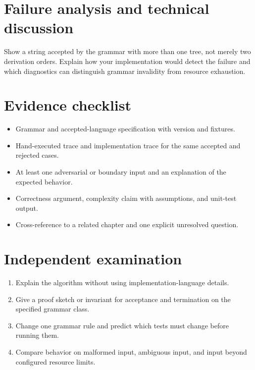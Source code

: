 \documentclass[11pt,letterpaper]{article}
\begin{document}
\section{Failure analysis and technical discussion}
Show a string accepted by the grammar with more than one tree, not merely two derivation orders. Explain how your implementation would detect the failure and which diagnostics can distinguish grammar invalidity from resource exhaustion.
\section{Evidence checklist}
\begin{itemize}
\item Grammar and accepted-language specification with version and fixtures.
\item Hand-executed trace and implementation trace for the same accepted and rejected cases.
\item At least one adversarial or boundary input and an explanation of the expected behavior.
\item Correctness argument, complexity claim with assumptions, and unit-test output.
\item Cross-reference to a related chapter and one explicit unresolved question.
\end{itemize}
\section{Independent examination}
\begin{enumerate}
\item Explain the algorithm without using implementation-language details.
\item Give a proof sketch or invariant for acceptance and termination on the specified grammar class.
\item Change one grammar rule and predict which tests must change before running them.
\item Compare behavior on malformed input, ambiguous input, and input beyond configured resource limits.
\end{enumerate}
\end{document}
